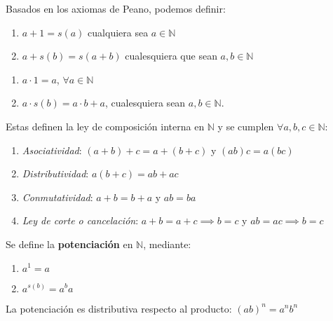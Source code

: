 Basados en los axiomas de Peano, podemos definir:

\begin{fmd-definition}[Adición en $\N$]
	\begin{enumerate}[label=\alph*)]
		\item $a + 1 = s(a)$ cualquiera sea $a \in \mathbb{N}$
		\item $a + s(b) = s(a + b)$ cualesquiera que sean $a, b \in \mathbb{N}$
	\end{enumerate}
\end{fmd-definition}

\begin{fmd-definition}[Multiplicación en $\N$]
	\begin{enumerate}[label=\alph*)]
		\item $a \cdot 1 = a$, $\forall a \in \mathbb{N}$
		\item $a \cdot s(b) = a \cdot b + a$, cualesquiera sean $a, b \in \mathbb{N}$.
	\end{enumerate}
\end{fmd-definition}

Estas definen la ley de composición interna en $\mathbb{N}$ y se cumplen $\forall a, b, c \in \mathbb{N}$:
\begin{enumerate}
	\item \textit{Asociatividad}: $(a+b)+c = a + (b+c)$ y $(ab)c = a(bc)$
	\item \textit{Distributividad}: $a(b+c) = ab + ac$
	\item \textit{Conmutatividad}: $a + b = b + a$ y $ab = ba$
	\item \textit{Ley de corte o cancelación}: $a+b = a + c \implies b=c$ y $ab=ac \implies b=c$
\end{enumerate}

Se define la \textbf{potenciación} en $\mathbb{N}$, mediante: 

\begin{fmd-definition}[Potenciación en $\N$]
	\begin{enumerate}[label=\alph*)]
		\item $a^1 = a$
		\item $a^{s(b)} = a^ba$
	\end{enumerate}
\end{fmd-definition}


\begin{fmd-proposition}
	La potenciación es distributiva respecto al producto: $(ab)^n = a^n b^n$
\end{fmd-proposition}

